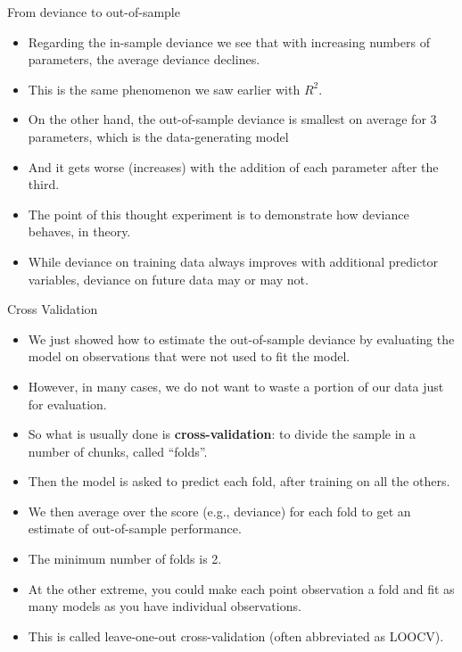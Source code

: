 \documentclass[handout]{beamer}
\begin{document}
\begin{frame}{From deviance to out-of-sample}
\scriptsize{

\begin{itemize}


\item Regarding the in-sample deviance we see that with increasing numbers of parameters, the average deviance declines. 
\item This is the same phenomenon we saw earlier with $R^2$.

\item On the other hand, the out-of-sample deviance is smallest on average for 3 parameters, which is the data-generating model
\item And it gets worse (increases) with the addition of each parameter after the third.

\item The point of this thought experiment is to demonstrate how deviance behaves, in theory. 
\item While deviance on training data always improves with additional predictor variables, deviance on future data may or may not.



\end{itemize}


} 
\end{frame}



\begin{frame}{Cross Validation}
\scriptsize{

\begin{itemize}
\item We just showed how to estimate the out-of-sample deviance by  evaluating the model on observations that were not used to fit the model. 

\item However, in many cases, we do not want to waste a portion of our data just for evaluation. 

\item So what is usually done is \textbf{cross-validation}: to divide the sample in a number of chunks, called ``folds''. 
\item Then the model is asked to predict each fold, after training on all the others.
\item We then average over the score (e.g., deviance) for each fold to get an estimate of out-of-sample performance. 
\item The minimum number of folds is 2. 
\item At the other extreme, you could make each point observation a fold and fit as many models as you have individual observations.
\item This is called leave-one-out cross-validation (often abbreviated as LOOCV).
\end{itemize}


} 
\end{frame}
\end{document}
